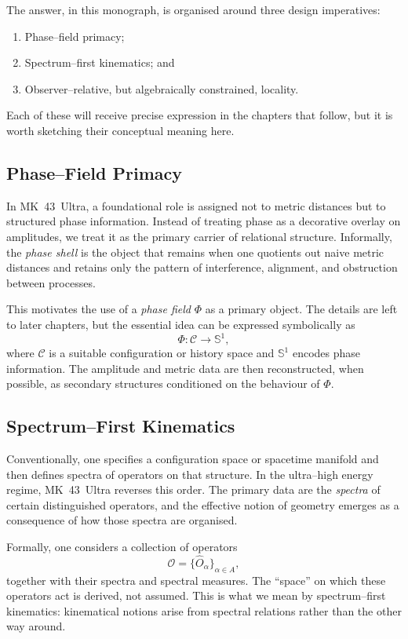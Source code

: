 The answer, in this monograph, is organised around three design imperatives:
\begin{enumerate}
  \item Phase--field primacy;
  \item Spectrum--first kinematics; and
  \item Observer--relative, but algebraically constrained, locality.
\end{enumerate}
Each of these will receive precise expression in the chapters that follow,
but it is worth sketching their conceptual meaning here.

\subsection{Phase--Field Primacy}
In MK~43~Ultra, a foundational role is assigned not to metric distances but to
structured phase information. Instead of treating phase as a decorative
overlay on amplitudes, we treat it as the primary carrier of relational
structure. Informally, the \emph{phase shell} is the object that remains when
one quotients out naive metric distances and retains only the pattern of
interference, alignment, and obstruction between processes.

This motivates the use of a \emph{phase field} $\Phi$ as a primary object.
The details are left to later chapters, but the essential idea can be
expressed symbolically as
\begin{equation}
  \Phi : \mathcal{C} \to \mathbb{S}^1,
\end{equation}
where $\mathcal{C}$ is a suitable configuration or history space and
$\mathbb{S}^1$ encodes phase information. The amplitude and metric data are
then reconstructed, when possible, as secondary structures conditioned on the
behaviour of $\Phi$.

\subsection{Spectrum--First Kinematics}
Conventionally, one specifies a configuration space or spacetime manifold and
then defines spectra of operators on that structure. In the ultra--high
energy regime, MK~43~Ultra reverses this order. The primary data are the
\emph{spectra} of certain distinguished operators, and the effective notion
of geometry emerges as a consequence of how those spectra are organised.

Formally, one considers a collection of operators
\begin{equation}
  \mathcal{O} = \{ \hat{O}_\alpha \}_{\alpha \in A},
\end{equation}
together with their spectra and spectral measures. The ``space'' on which
these operators act is derived, not assumed. This is what we mean by
spectrum--first kinematics: kinematical notions arise from spectral relations
rather than the other way around.

